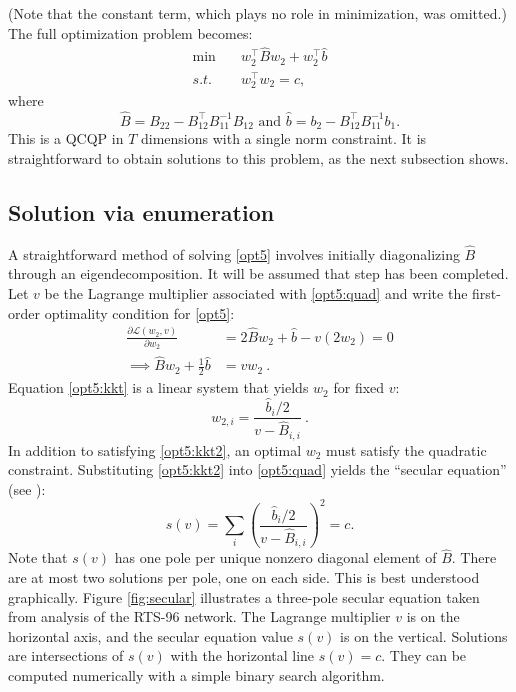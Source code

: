 \documentclass[conference]{IEEEtran}
\begin{document}
(Note that the constant term, which plays no role in minimization, was
omitted.) The full optimization problem becomes:
\begin{subequations}\label{opt5}
\begin{align}
\min\quad & w_2^\top \hat{B}w_2 + w_2^\top \hat{b} \\
\label{opt5:quad} s.t.\quad & w_2^\top w_2 = c,
\end{align}
\end{subequations}
where
\[
\hat{B} = B_{22} - B_{12}^\top B_{11}^{-1}B_{12} \text{ and }\hat{b} = b_2 - B_{12}^\top B_{11}^{-1}b_1.
\]
This is a QCQP in $T$ dimensions with a single norm constraint. It is
straightforward to obtain solutions to this problem, as the next
subsection shows.

\subsection{Solution via enumeration}

A straightforward method of solving \eqref{opt5} involves initially
diagonalizing $\hat{B}$ through an eigendecomposition. It will be
assumed that step has been completed. Let $v$ be the Lagrange multiplier associated with \eqref{opt5:quad} and write the first-order optimality condition for \eqref{opt5}:
\begin{align}
\nonumber \frac{\partial \mathcal{L}(w_2,v)}{\partial w_2} &= 2\hat{B}w_2 + \hat{b} - v(2w_2) = 0 \\
\label{opt5:kkt} \implies \hat{B}w_2 + \frac{1}{2}\hat{b} &= vw_2~.
\end{align}
Equation \eqref{opt5:kkt} is a linear system that yields $w_2$ for fixed $v$:
\begin{equation}
\label{opt5:kkt2}w_{2,i} = \frac{\hat{b}_i/2}{v - \hat{B}_{i,i}}~.
\end{equation}
In addition to satisfying \eqref{opt5:kkt2}, an optimal $w_2$ must
satisfy the quadratic constraint. Substituting \eqref{opt5:kkt2} into
\eqref{opt5:quad} yields the ``secular equation'' (see
\cite{bienstock2014}):
\begin{equation}
s(v) = \sum_{i}\left( \frac{\hat{b}_i /2}{v - \hat{B}_{i,i}}\right)^2 = c.
\end{equation}
Note that $s(v)$ has one pole per unique nonzero diagonal element of
$\hat{B}$. There are at most two solutions per pole, one on each
side. This is best understood graphically. Figure \ref{fig:secular}
illustrates a three-pole secular equation taken from analysis of the
RTS-96 network. The Lagrange multiplier $v$ is on the horizontal axis,
and the secular equation value $s(v)$ is on the vertical. Solutions
are intersections of $s(v)$ with the horizontal line $s(v)=c$. They
can be computed numerically with a simple binary search algorithm.
\end{document}
